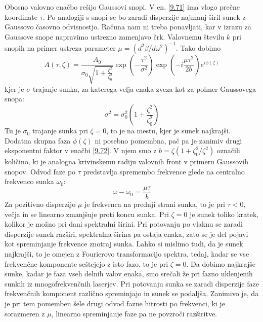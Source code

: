 Obosno valovno enačbo rešijo Gaussovi snopi. V en. \ref{9.71} ima
vlogo prečne koordinate $\tau.$ Po analogiji s snopi se bo zaradi
disperzije najmanj širil sunek z Gaussovo časovno odvisnostjo. Računa
nam ni treba ponavljati, kar v izrazu za Gaussove snope napravimo
ustrezno zamenjavo črk. Valovnemu številu $k$ pri snopih na primer
ustreza parameter $\mu=(d^{2}\beta/d\omega^{2})^{-1}$. Tako dobimo
\begin{equation}
A\left(\tau,\zeta\right)=\frac{A_{0}}{\sigma_{0}\sqrt{1+\frac{\zeta^{2}}{\zeta_{0}^{2}}}}\exp\left(-\frac{\tau^{2}}{\sigma^{2}}\right)\exp\left(-i\frac{\mu\tau^{2}}{2b}\right)e^{i\phi\left(\zeta\right)}\label{9.72}
\end{equation}
 kjer je $\sigma$ trajanje sunka, za katerega velja enaka zveza kot
za polmer Gaussovega snopa: 
\begin{equation}
\sigma^{2}=\sigma_{0}^{2}\left(1+\frac{\zeta^{2}}{\zeta_{0}^{2}}\right)\label{9.73}
\end{equation}
 Tu je $\sigma_{0}$ trajanje sunka pri $\zeta=0$, to je na mestu,
kjer je sunek najkrajši. Dodatna skupna faza $\phi\left(\zeta\right)$
ni posebno pomembna, pač pa je zanimiv drugi eksponentni faktor v
enačbi \ref{9.72}. V njem smo z $b=\zeta\left(1+\zeta_{0}^{2}/\zeta^{2}\right)$
označili količino, ki je analogna krivinskemu radiju valovnih front
v primeru Gaussovih snopov. Odvod faze po $\tau$ predstavlja spremembo
frekvence glede na centralno frekvenco sunka $\omega_{0}$: 
\begin{equation}
\omega-\omega_{0}=\frac{\mu\tau}{b}\label{9.74}
\end{equation}
 Za pozitivno disperzijo $\mu$ je frekvenca na prednji strani sunka,
to je pri $\tau<0$, večja in se linearno zmanjšuje proti koncu sunka.
Pri $\zeta=0$ je sunek toliko kratek, kolikor je možno pri dani spektralni
širini. Pri potovanju po vlaknu se zaradi disperzije sunek razširi,
spektralna širina pa ostaja enaka, zato se je del pojavi kot spreminjanje
frekvence znotraj sunka. Lahko si mislimo tudi, da je sunek najkrajši,
to je omejen z Fourierovo transformacijo spektra, tedaj, kadar se
vse frekvenčne komponente seštejejo z isto fazo, to je pri $\zeta=0$.
Da dobimo najkrajše sunke, kadar je faza vseh delnih valov enaka,
smo srečali že pri fazno uklenjenih sunkih iz mnogofrekvenčnih laserjev.
Pri potovanju sunka se zaradi disperzije faze frekvenčnih komponent
različno spreminjajo in sunek se podaljša. Zanimivo je, da je pri
tem pomemben šele drugi odvod fazne hitrosti po frekvenci, ki je sorazmeren
z $\mu$, linearno spreminjanje faze pa ne povzroči razširitve.

